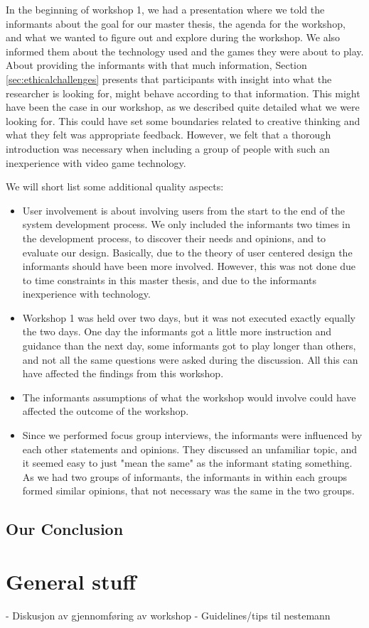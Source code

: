 In the beginning of workshop 1, we had a presentation where we told the informants about the goal for our master thesis, the agenda for the workshop, and what we wanted to figure out and explore during the workshop. We also informed them about the technology used and the games they were about to play. About providing the informants with that much information, Section \ref{sec:ethicalchallenges} presents that participants with insight into what the researcher is looking for, might behave according to that information. This might have been the case in our workshop, as we described quite detailed what we were looking for. This could have set some boundaries related to creative thinking and what they felt was appropriate feedback. However, we felt that a thorough introduction was necessary when including a group of people with such an inexperience with video game technology. 

We will short list some additional quality aspects: 
\begin{itemize}
\renewcommand{\labelitemi}{$\bullet$}
\item User involvement is about involving users from the start to the end of the system development process. We only included the informants two times in the development process, to discover their needs and opinions, and to evaluate our design. Basically, due to the theory of user centered design the informants should have been more involved. However, this was not done due to time constraints in this master thesis, and due to the informants inexperience with technology. 
\item Workshop 1 was held over two days, but it was not executed exactly equally the two days. One day the informants got a little more instruction and guidance than the next day, some informants got to play longer than others, and not all the same questions were asked during the discussion. All this can have affected the findings from this workshop. 
\item The informants assumptions of what the workshop would involve could have affected the outcome of the workshop. 
\item Since we performed focus group interviews, the informants were influenced by each other statements and opinions. They discussed an unfamiliar topic, and it seemed easy to just "mean the same" as the informant stating something. As we had two groups of informants, the informants in within each groups formed similar opinions, that not necessary was the same in the two groups.   
\end{itemize}

\subsection{Our Conclusion}

\section{General stuff}
- Diskusjon av gjennomføring av workshop
- Guidelines/tips til nestemann

